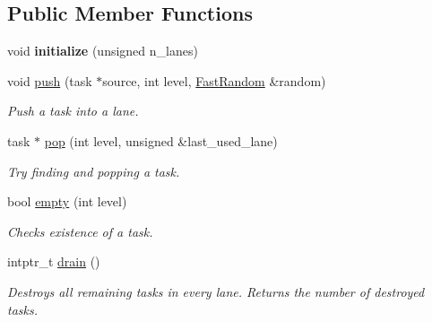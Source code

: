 \subsection*{Public Member Functions}
\begin{DoxyCompactItemize}
\item 
\hypertarget{classtbb_1_1internal_1_1task__stream_a3b760dc36d767fe1aaa77d750c8a1f8e}{}void {\bfseries initialize} (unsigned n\+\_\+lanes)\label{classtbb_1_1internal_1_1task__stream_a3b760dc36d767fe1aaa77d750c8a1f8e}

\item 
\hypertarget{classtbb_1_1internal_1_1task__stream_a1a280bfd897359f8334faadf48590f5e}{}void \hyperlink{classtbb_1_1internal_1_1task__stream_a1a280bfd897359f8334faadf48590f5e}{push} (task $\ast$source, int level, \hyperlink{classtbb_1_1internal_1_1FastRandom}{Fast\+Random} \&random)\label{classtbb_1_1internal_1_1task__stream_a1a280bfd897359f8334faadf48590f5e}

\begin{DoxyCompactList}\small\item\em Push a task into a lane. \end{DoxyCompactList}\item 
\hypertarget{classtbb_1_1internal_1_1task__stream_a7eb7e2f599540e2a0cda5d4f6efe5dea}{}task $\ast$ \hyperlink{classtbb_1_1internal_1_1task__stream_a7eb7e2f599540e2a0cda5d4f6efe5dea}{pop} (int level, unsigned \&last\+\_\+used\+\_\+lane)\label{classtbb_1_1internal_1_1task__stream_a7eb7e2f599540e2a0cda5d4f6efe5dea}

\begin{DoxyCompactList}\small\item\em Try finding and popping a task. \end{DoxyCompactList}\item 
\hypertarget{classtbb_1_1internal_1_1task__stream_ae4582f39eaa5a09b2ec509cf6316a5d7}{}bool \hyperlink{classtbb_1_1internal_1_1task__stream_ae4582f39eaa5a09b2ec509cf6316a5d7}{empty} (int level)\label{classtbb_1_1internal_1_1task__stream_ae4582f39eaa5a09b2ec509cf6316a5d7}

\begin{DoxyCompactList}\small\item\em Checks existence of a task. \end{DoxyCompactList}\item 
intptr\+\_\+t \hyperlink{classtbb_1_1internal_1_1task__stream_ad034dbcc7bd22f6af5fbeef7aae9c60e}{drain} ()
\begin{DoxyCompactList}\small\item\em Destroys all remaining tasks in every lane. Returns the number of destroyed tasks. \end{DoxyCompactList}\end{DoxyCompactItemize}


